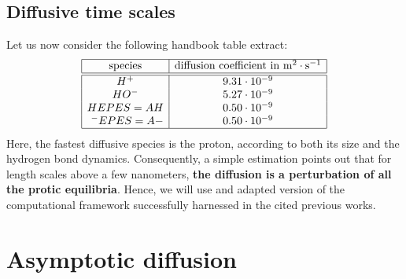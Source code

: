\documentclass[aps,11pt]{revtex4}
\begin{document}
\subsection{Diffusive time scales}
Let us now consider the following handbook table extract:
\begin{equation}
\label{tab:diff}
\begin{array}{|c|c|}
\hline
\text{species} & \text{diffusion coefficient in } \text{m}^2\cdot\text{s}^{-1} \\
\hline
\hline
H^+     & 9.31 \cdot 10^{-9} \\
HO^-    & 5.27 \cdot 10^{-9} \\
 HEPES=AH  &   0.50 \cdot 10^{-9}\\
~^-EPES=A- &   0.50 \cdot 10^{-9}\\
\hline
\end{array}
\end{equation}
Here, the fastest diffusive species is the proton, according to both its size and the hydrogen bond dynamics.
Consequently, a simple estimation points out that for length scales above a few nanometers, \textbf{the diffusion is a perturbation of all the protic equilibria}.
Hence, we will use and adapted version of the computational framework successfully harnessed in the cited previous works.

\section{Asymptotic diffusion}
\end{document}
